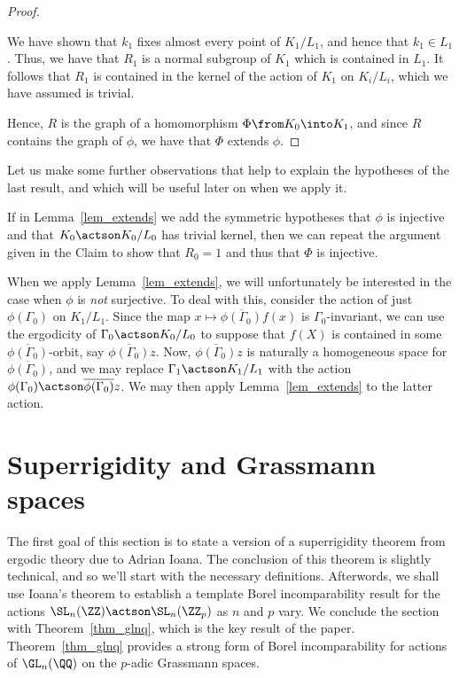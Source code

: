 \documentclass[oneside,leqno,11pt]{amsart}
\begin{document}
\begin{proof}
\begin{claimproof}
    We have shown that $k_1$ fixes almost every point of $K_1/L_1$,
    and hence that $k_1\in L_1$.  Thus, we have that $R_1$ is a normal
    subgroup of $K_1$ which is contained in $L_1$.  It follows that
    $R_1$ is contained in the kernel of the action of $K_1$ on
    $K_i/L_i$, which we have assumed is trivial.
  \end{claimproof}
  Hence, $R$ is the graph of a homomorphism $\Phi\from K_0\into K_1$,
  and since $R$ contains the graph of $\phi$, we have that $\Phi$
  extends $\phi$.
\end{proof}

Let us make some further observations that help to explain the
hypotheses of the last result, and which will be useful later on when
we apply it.

\begin{rem}
  If in Lemma~\ref{lem_extends} we add the symmetric hypotheses that
  $\phi$ is injective and that $K_0\actson K_0/L_0$ has trivial
  kernel, then we can repeat the argument given in the Claim to show
  that $R_0=1$ and thus that $\Phi$ is injective.
\end{rem}

\begin{rem}
  When we apply Lemma~\ref{lem_extends}, we will unfortunately be
  interested in the case when $\phi$ is \emph{not} surjective.  To
  deal with this, consider the action of just $\phi(\Gamma_0)$ on
  $K_1/L_1$.  Since the map $x\mapsto\overline{\phi(\Gamma_0)}f(x)$ is
  $\Gamma_0$-invariant, we can use the ergodicity of $\Gamma_0\actson
  K_0/L_0$ to suppose that $f(X)$ is contained in some
  $\overline{\phi(\Gamma_0)}$-orbit, say $\overline{\phi(\Gamma_0)}z$.
  Now, $\overline{\phi(\Gamma_0)}z$ is naturally a homogeneous space
  for $\overline{\phi(\Gamma_0)}$, and we may replace $\Gamma_1\actson
  K_1/L_1$ with the action
  $\phi(\Gamma_0)\actson\overline{\phi(\Gamma_0)}z$.  We may then
  apply Lemma~\ref{lem_extends} to the latter action.
\end{rem}

\section{Superrigidity and Grassmann spaces}

The first goal of this section is to state a version of a
superrigidity theorem from ergodic theory due to Adrian Ioana.  The
conclusion of this theorem is slightly technical, and so we'll start
with the necessary definitions.  Afterwords, we shall use Ioana's
theorem to establish a template Borel incomparability result for the
actions $\SL_n(\ZZ)\actson\SL_n(\ZZ_p)$ as $n$ and $p$ vary.  We
conclude the section with Theorem~\ref{thm_glnq}, which is the key
result of the paper.  Theorem~\ref{thm_glnq} provides a strong form of
Borel incomparability for actions of $\GL_n(\QQ)$ on the $p$-adic
Grassmann spaces.
\end{document}
